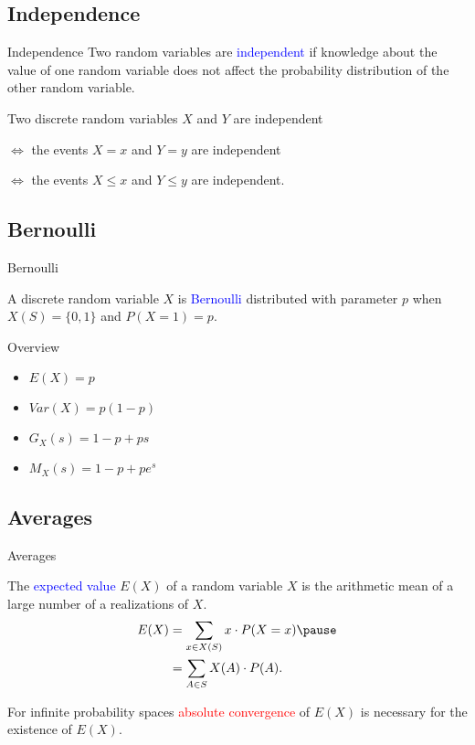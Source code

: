 \documentclass{beamer}
\def\padding{\vspace{0.5cm}}
\def\b{\textcolor{blue}}
\def\r{\textcolor{red}}
\begin{document}
\subsection{Independence}
\begin{frame}{Independence}
    Two random variables are \b{independent} if knowledge about the value of one random variable does not affect the probability distribution of the other random variable.\pause\par\padding
    Two discrete random variables $X$ and $Y$ are independent\par
    $\iff$ the events $X=x$ and $Y=y$ are independent\pause\par
    $\iff$ the events $X \leq x$ and $Y \leq y$ are independent.
\end{frame}

\subsection{Bernoulli}
\begin{frame}{Bernoulli}
    \begin{definition}
        A discrete random variable $X$ is \b{Bernoulli} distributed with parameter $p$ when $X(S) = \{0,1\}$ and $P(X=1) = p$.
    \end{definition}\pause
    \begin{exampleblock}{Overview}
        \begin{itemize}
            \item $E(X) = p$
            \item $Var(X) = p (1 - p)$
            \item $G_X(s) = 1 - p + p s$
            \item $M_X(s) = 1 - p + p e^s$
        \end{itemize}
    \end{exampleblock}
\end{frame}

\subsection{Averages}
\begin{frame}{Averages}
    \begin{definition}
        The \b{expected value} $E(X)$ of a random variable $X$ is the arithmetic mean of a large number of a realizations of $X$.\pause
        \begin{align*}
            E(X) &= \sum_{x \in X(S)} x \cdot P(X = x)\pause \\
                 &= \sum_{A \in S} X(A) \cdot P(A).
        \end{align*}
    \end{definition}\pause\par\padding
    For infinite probability spaces \r{absolute convergence} of $E(X)$ is necessary for the existence of $E(X)$.
\end{frame}
\end{document}
